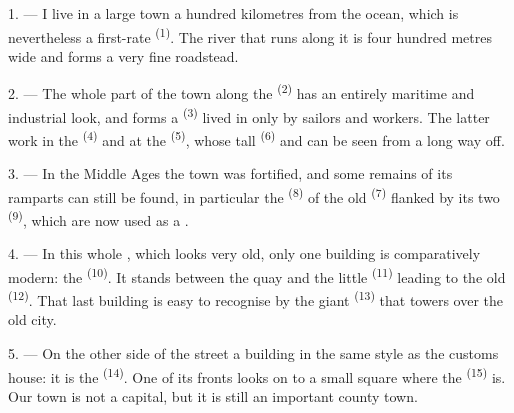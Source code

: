 
\VUsaut{2.0mm}
\VUsaut{3.0mm}
\VUfilet{16mm}
\VUsaut{5.6mm}
\VUsaut{1.4mm}
\VUsaut{2.2mm}

\VUsaut{3.0mm}

1. --- I live in a large town a hundred kilometres from the ocean, which is nevertheless a
first-rate  \textsuperscript{(1)}. The river that runs along it is four hundred
metres wide and forms a very fine roadstead.

2. --- The whole part of the town along the  \textsuperscript{(2)} has an
entirely maritime and industrial look, and forms a  \textsuperscript{(3)} lived
in only by sailors and workers. The latter work in the
 \textsuperscript{(4)} and at the  \textsuperscript{(5)},
whose tall  \textsuperscript{(6)} and  can be seen from a
long way off.

3. --- In the Middle Ages the town was fortified, and some remains of its ramparts can still
be found, in particular the  \textsuperscript{(8)} of the old
 \textsuperscript{(7)} flanked by its two
 \textsuperscript{(9)}, which are now used as a .

4. --- In this whole , which looks very old, only one building is
comparatively modern: the  \textsuperscript{(10)}. It stands between the
quay and the little  \textsuperscript{(11)} leading to the old
 \textsuperscript{(12)}. That last building is easy to recognise by the
giant  \textsuperscript{(13)} that towers over the old city.

5. --- On the other side of the street  a building in the same style as the
customs house: it is the  \textsuperscript{(14)}. One of its fronts looks on
to a small square where the
 \textsuperscript{(15)} is. Our town is not a capital, but it is
still an important county town.

